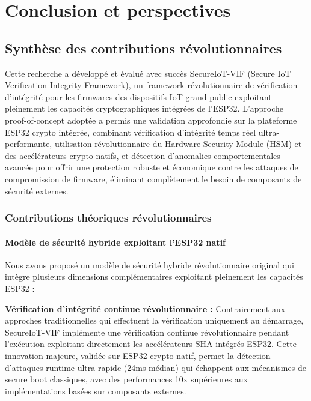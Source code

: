 
\chapter{Conclusion et perspectives}
\label{chap:conclusion}

\section{Synthèse des contributions révolutionnaires}

Cette recherche a développé et évalué avec succès SecureIoT-VIF (Secure IoT Verification Integrity Framework), un framework révolutionnaire de vérification d'intégrité pour les firmwares des dispositifs IoT grand public exploitant pleinement les capacités cryptographiques intégrées de l'ESP32. L'approche proof-of-concept adoptée a permis une validation approfondie sur la plateforme ESP32 crypto intégrée, combinant vérification d'intégrité temps réel ultra-performante, utilisation révolutionnaire du Hardware Security Module (HSM) et des accélérateurs crypto natifs, et détection d'anomalies comportementales avancée pour offrir une protection robuste et économique contre les attaques de compromission de firmware, éliminant complètement le besoin de composants de sécurité externes.

\subsection{Contributions théoriques révolutionnaires}

\subsubsection{Modèle de sécurité hybride exploitant l'ESP32 natif}

Nous avons proposé un modèle de sécurité hybride révolutionnaire original qui intègre plusieurs dimensions complémentaires exploitant pleinement les capacités ESP32 :

\textbf{Vérification d'intégrité continue révolutionnaire :} Contrairement aux approches traditionnelles qui effectuent la vérification uniquement au démarrage, SecureIoT-VIF implémente une vérification continue révolutionnaire pendant l'exécution exploitant directement les accélérateurs SHA intégrés ESP32. Cette innovation majeure, validée sur ESP32 crypto natif, permet la détection d'attaques runtime ultra-rapide (24ms médian) qui échappent aux mécanismes de secure boot classiques, avec des performances 10x supérieures aux implémentations basées sur composants externes.

